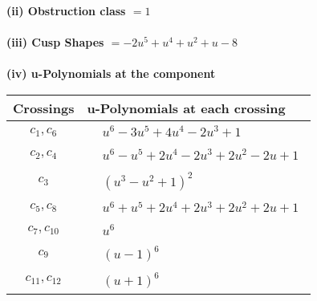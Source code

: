 \documentclass[1p]{elsarticle_modified}
\theoremstyle{definition}
\begin{document}
\flushleft \textbf{(ii) Obstruction class $= 1$}\\~\\
\flushleft \textbf{(iii) Cusp Shapes $= -2 u^5+u^4+u^2+u-8$}\\~\\
\newpage\renewcommand{\arraystretch}{1}
\flushleft \textbf{(iv) u-Polynomials at the component}\newline \\
\begin{tabular}{m{50pt}|m{274pt}}
Crossings & \hspace{64pt}u-Polynomials at each crossing \\
\hline $$\begin{aligned}c_{1},c_{6}\end{aligned}$$&$\begin{aligned}
&u^6-3 u^5+4 u^4-2 u^3+1
\end{aligned}$\\
\hline $$\begin{aligned}c_{2},c_{4}\end{aligned}$$&$\begin{aligned}
&u^6- u^5+2 u^4-2 u^3+2 u^2-2 u+1
\end{aligned}$\\
\hline $$\begin{aligned}c_{3}\end{aligned}$$&$\begin{aligned}
&(u^3- u^2+1)^2
\end{aligned}$\\
\hline $$\begin{aligned}c_{5},c_{8}\end{aligned}$$&$\begin{aligned}
&u^6+u^5+2 u^4+2 u^3+2 u^2+2 u+1
\end{aligned}$\\
\hline $$\begin{aligned}c_{7},c_{10}\end{aligned}$$&$\begin{aligned}
&u^6
\end{aligned}$\\
\hline $$\begin{aligned}c_{9}\end{aligned}$$&$\begin{aligned}
&(u-1)^6
\end{aligned}$\\
\hline $$\begin{aligned}c_{11},c_{12}\end{aligned}$$&$\begin{aligned}
&(u+1)^6
\end{aligned}$\\
\hline
\end{tabular}\\~\\
\end{document}
